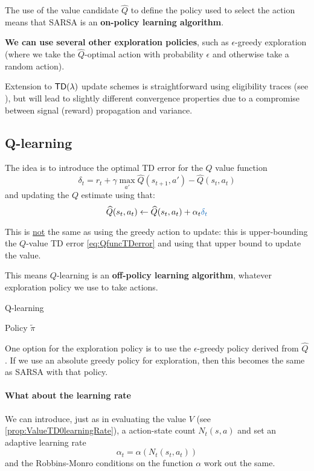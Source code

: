 \documentclass[../course-notes.tex]{subfiles}
\begin{document}
The use of the value candidate $\widehat{Q}$ to define the policy used to select the action means that SARSA is an \textbf{\bluefont on-policy learning algorithm}.

\textbf{We can use several other exploration policies}, such as $\epsilon$-greedy exploration (where we take the $\widehat{Q}$-optimal action with probability $\epsilon$ and otherwise take a random action).

Extension to $\mathsf{TD}(\lambda)$ update schemes is straightforward using eligibility traces (see \cite[chap.~12]{Sutton1998}), but will lead to slightly different convergence properties due to a compromise between signal (reward) propagation and variance.



\subsection{Q-learning}\label{sec:QLearning}

The idea is to introduce the optimal TD error for the $Q$ value function
\begin{equation}\label{eq:QlearnTDerror}
	\delta_t = r_t + \gamma \max_{a'}\widehat{Q}(s_{t+1},a') - \widehat{Q}(s_t,a_t)
\end{equation}
and updating the $Q$ estimate using that:
\[
	\widehat{Q}(s_t,a_t) \leftarrow \widehat{Q}(s_t,a_t) + \alpha_t {\bluefont\delta_t}
\]

This is \underline{not} the same as using the greedy action to update: this is upper-bounding the $Q$-value TD error \eqref{eq:QfuncTDerror} and using that upper bound to update the value.

This means $Q$-learning is an \textbf{\bluefont off-policy learning algorithm}, whatever exploration policy we use to take actions.

\begin{algorithm}
	\caption{Q-learning}
	\Return Policy $\tilde{\pi}$\;
\end{algorithm}

One option for the exploration policy is to use the $\epsilon$-greedy policy derived from $\widehat{Q}$. If we use an absolute greedy policy for exploration, then this becomes the same as SARSA with that policy.



\paragraph{What about the learning rate} We can introduce, just as in evaluating the value $V$ (see \cref{prop:ValueTD0learningRate}), a action-state count $N_t(s,a)$ and set an adaptive learning rate
\[
	\alpha_t = \alpha(N_t(s_t, a_t))
\]
and the Robbins-Monro conditions on the function $\alpha$ work out the same.
\end{document}
